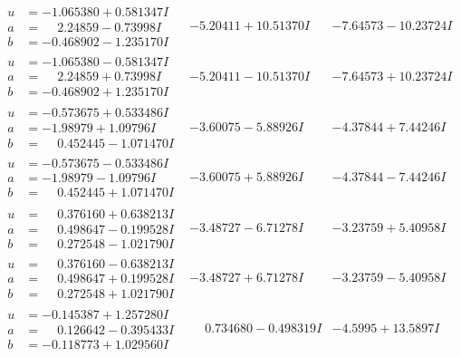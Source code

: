 \documentclass[1p]{elsarticle_modified}
\theoremstyle{definition}
\begin{document}
$$\begin{array}{c|c|c}
\begin{aligned}
u &= -1.065380 + 0.581347 I \\
a &= \phantom{-}2.24859 - 0.73998 I \\
b &= -0.468902 - 1.235170 I\end{aligned}
 & -5.20411 + 10.51370 I & -7.64573 - 10.23724 I \\ \hline\begin{aligned}
u &= -1.065380 - 0.581347 I \\
a &= \phantom{-}2.24859 + 0.73998 I \\
b &= -0.468902 + 1.235170 I\end{aligned}
 & -5.20411 - 10.51370 I & -7.64573 + 10.23724 I \\ \hline\begin{aligned}
u &= -0.573675 + 0.533486 I \\
a &= -1.98979 + 1.09796 I \\
b &= \phantom{-}0.452445 - 1.071470 I\end{aligned}
 & -3.60075 - 5.88926 I & -4.37844 + 7.44246 I \\ \hline\begin{aligned}
u &= -0.573675 - 0.533486 I \\
a &= -1.98979 - 1.09796 I \\
b &= \phantom{-}0.452445 + 1.071470 I\end{aligned}
 & -3.60075 + 5.88926 I & -4.37844 - 7.44246 I \\ \hline\begin{aligned}
u &= \phantom{-}0.376160 + 0.638213 I \\
a &= \phantom{-}0.498647 - 0.199528 I \\
b &= \phantom{-}0.272548 - 1.021790 I\end{aligned}
 & -3.48727 - 6.71278 I & -3.23759 + 5.40958 I \\ \hline\begin{aligned}
u &= \phantom{-}0.376160 - 0.638213 I \\
a &= \phantom{-}0.498647 + 0.199528 I \\
b &= \phantom{-}0.272548 + 1.021790 I\end{aligned}
 & -3.48727 + 6.71278 I & -3.23759 - 5.40958 I \\ \hline\begin{aligned}
u &= -0.145387 + 1.257280 I \\
a &= \phantom{-}0.126642 - 0.395433 I \\
b &= -0.118773 + 1.029560 I\end{aligned}
 & \phantom{-}0.734680 - 0.498319 I & -4.5995 + 13.5897 I \\ \hline\begin{aligned}

\end{aligned}
\end{array}$$
\end{document}
